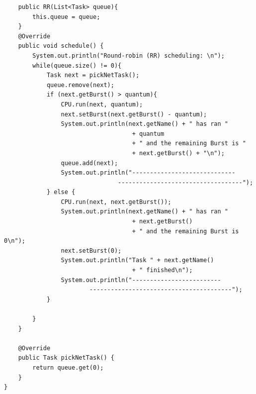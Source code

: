 \documentclass[12pt]{article}
\newenvironment{sol}[1][Solution]{\begin{trivlist}\item[\hskip\labelsep {\bfseries #1:}]}{\end{trivlist}}
\begin{document}
\begin{enumerate}
\begin{sol}
\begin{enumerate}
\begin{verbatim}
    public RR(List<Task> queue){
        this.queue = queue;
    }
    @Override
    public void schedule() {
        System.out.println("Round-robin (RR) scheduling: \n");
        while(queue.size() != 0){
            Task next = pickNetTask();
            queue.remove(next);
            if (next.getBurst() > quantum){
                CPU.run(next, quantum);
                next.setBurst(next.getBurst() - quantum);
                System.out.println(next.getName() + " has ran " 
                                    + quantum 
                                    + " and the remaining Burst is " 
                                    + next.getBurst() + "\n");
                queue.add(next);
                System.out.println("-----------------------------
                                -----------------------------------");
            } else {
                CPU.run(next, next.getBurst());
                System.out.println(next.getName() + " has ran " 
                                    + next.getBurst() 
                                    + " and the remaining Burst is 0\n");
                next.setBurst(0);
                System.out.println("Task " + next.getName() 
                                    + " finished\n");
                System.out.println("-------------------------
                        ----------------------------------------");
            }

        }
    }

    @Override
    public Task pickNetTask() {
        return queue.get(0);
    }
}


\end{verbatim}
\end{enumerate}
\end{sol}
\end{enumerate}
\end{document}
